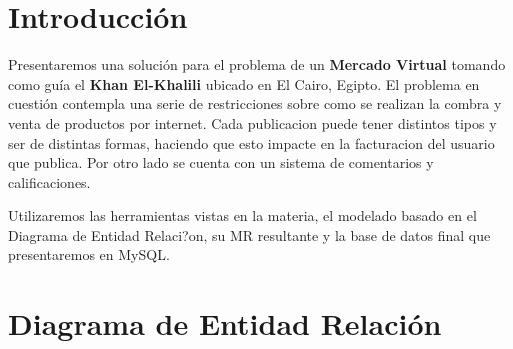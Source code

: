 \documentclass[a4paper, 10pt, twoside]{article}
\begin{document}
\newpage




\section{Introducción}

Presentaremos una soluci\'on para el problema de un \textbf{Mercado Virtual} tomando como gu\'ia el \textbf{Khan El-Khalili} ubicado en El Cairo, Egipto. El problema en cuesti\'on contempla una serie de restricciones sobre como se realizan la combra y venta de productos por internet. Cada publicacion puede tener distintos tipos y ser de distintas formas, haciendo que esto impacte en la facturacion del usuario que publica. Por otro lado se cuenta con un sistema de comentarios y calificaciones.

Utilizaremos las herramientas vistas en la materia, el modelado basado en el Diagrama de Entidad Relaci?on, su MR resultante y la base de datos final que presentaremos en MySQL.



\section{Diagrama de Entidad Relación}
\end{document}
